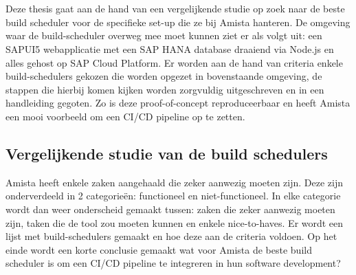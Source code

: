 
\chapter{}
\label{ch:methodologie}

Deze thesis gaat aan de hand van een vergelijkende studie op zoek naar de beste build scheduler voor de specifieke set-up die ze bij Amista hanteren. De omgeving waar de build-scheduler overweg mee moet kunnen ziet er als volgt uit: een SAPUI5 webapplicatie met een SAP HANA database draaiend via Node.js en alles gehost op SAP Cloud Platform. Er worden aan de hand van criteria enkele build-schedulers gekozen die worden opgezet in bovenstaande omgeving, de stappen die hierbij komen kijken worden zorgvuldig uitgeschreven en in een handleiding gegoten. Zo is deze proof-of-concept reproduceerbaar en heeft Amista een mooi voorbeeld om een CI/CD pipeline op te zetten.


\section{Vergelijkende studie van de build schedulers}
\label{sec:Vergelijkende-studie-build-schedulers}
Amista heeft enkele zaken aangehaald die zeker aanwezig moeten zijn. Deze zijn onderverdeeld in 2 categorieën: functioneel en niet-functioneel. In elke categorie wordt dan weer onderscheid gemaakt tussen: zaken die zeker aanwezig moeten zijn, taken die de tool zou moeten kunnen en enkele nice-to-haves. Er wordt een lijst met build-schedulers gemaakt en hoe deze aan de criteria voldoen. Op het einde wordt een korte conclusie gemaakt wat voor Amista de beste build scheduler is om een CI/CD pipeline te integreren in hun software development? %

